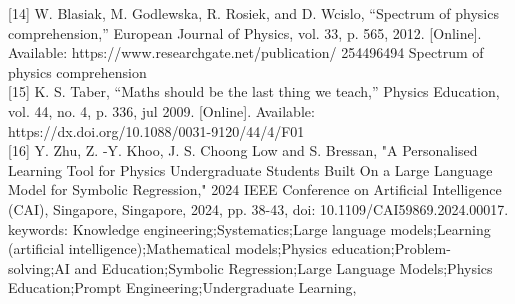 \documentclass{article}
\begin{document}
[14] W. Blasiak, M. Godlewska, R. Rosiek, and D. Wcislo, “Spectrum of
physics comprehension,” European Journal of Physics, vol. 33, p. 565,
2012. [Online]. Available: https://www.researchgate.net/publication/
254496494 Spectrum of physics comprehension\\

[15] K. S. Taber, “Maths should be the last thing we teach,” Physics
Education, vol. 44, no. 4, p. 336, jul 2009. [Online]. Available:
https://dx.doi.org/10.1088/0031-9120/44/4/F01\\ 

[16] Y. Zhu, Z. -Y. Khoo, J. S. Choong Low and S. Bressan, "A Personalised Learning Tool for Physics Undergraduate Students Built On a Large Language Model for Symbolic Regression," 2024 IEEE Conference on Artificial Intelligence (CAI), Singapore, Singapore, 2024, pp. 38-43, doi: 10.1109/CAI59869.2024.00017. keywords: {Knowledge engineering;Systematics;Large language models;Learning (artificial intelligence);Mathematical models;Physics education;Problem-solving;AI and Education;Symbolic Regression;Large Language Models;Physics Education;Prompt Engineering;Undergraduate Learning},\\
\end{document}
